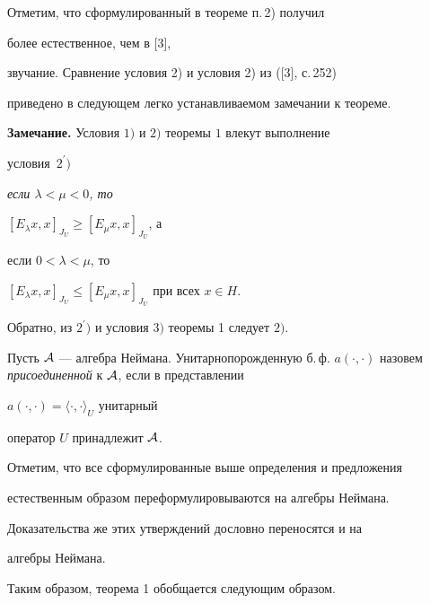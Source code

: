 Отметим, что сформулированный в теореме п.\,2) получил


более естественное, чем в [3],


звучание. Сравнение условия 2) и условия 2) из ([3], с.\,252)


приведено в следующем легко устанавливаемом замечании к теореме.


\medskip





{\bf Замечание.} Условия $1)$ и $2)$ теоремы $1$ влекут выполнение


условия~$2^{\prime})$ {\it если $\lambda <\mu <0$, то


$[E_{\lambda}x,x]_{J_{U}}\geq [E_{\mu}x,x]_{J_{U}}$, а


если $0<\lambda <\mu$, то


$[E_{\lambda}x,x]_{J_{U}}\leq [E_{\mu}x,x]_{J_{U}}$ при всех $x\in H$. }





Обратно, из $2^{\prime})$ и условия $3)$ теоремы 1 следует $2)$.


\medskip





Пусть $\cal A$ --- алгебра Неймана. Унитарнопорожденную б.\,ф. $a(\cdot


,\cdot)$ назовем {\it присоединенной} к $\cal A$, если в представлении


$a(\cdot,\cdot)=\langle\cdot,\cdot \rangle_U$ унитарный


оператор $U$ принадлежит $\cal A$.





Отметим, что все сформулированные выше определения и предложения


естественным образом переформулировываются на алгебры Неймана.


Доказательства же этих утверждений дословно переносятся и на


алгебры Неймана.


Таким образом, теорема 1 обобщается следующим образом.





